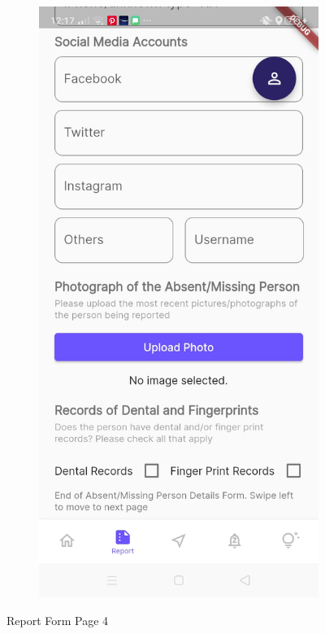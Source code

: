\begin{figure}[!h]
\begin{subfigure}[c]{0.40\linewidth}
    \end{subfigure}
        \centering
    \begin{subfigure}[c]{0.40\linewidth}
        \centering
        \includegraphics[scale=0.15]{figures/Chapter4/Main/p4-4.jpg}
    \end{subfigure}
    \caption{Report Form Page 4}
    \label{fig:ReportPage4}
\end{figure}
